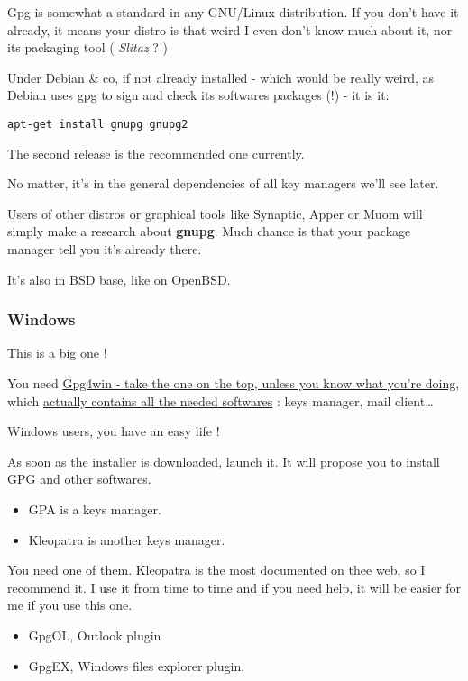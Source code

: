 Gpg is somewhat a standard in any GNU/Linux distribution. If you don't
have it already, it means your distro is that weird I even don't know
much about it, nor its packaging tool ( \emph{Slitaz} ? )

Under Debian \& co, if not already installed - which would be really
weird, as Debian uses gpg to sign and check its softwares packages (!) -
it is it:

\begin{verbatim}
apt-get install gnupg gnupg2
\end{verbatim}

The second release is the recommended one currently.

No matter, it's in the general dependencies of all key managers we'll
see later.

Users of other distros or graphical tools like Synaptic, Apper or Muom
will simply make a research about \textbf{gnupg}. Much chance is that
your package manager tell you it's already there.

It's also in BSD base, like on OpenBSD.

\subsubsection{Windows}\label{windows}

This is a big one !

You need \href{http://www.gpg4win.org/download.html}{Gpg4win - take the
one on the top, unless you know what you're doing}, which
\href{http://www.gpg4win.org/about.html}{actually contains all the
needed softwares} : keys manager, mail client\ldots{}

Windows users, you have an easy life !

As soon as the installer is downloaded, launch it. It will propose you
to install GPG and other softwares.

\begin{itemize}
\itemsep1pt\parskip0pt
\item
  GPA is a keys manager.
\item
  Kleopatra is another keys manager.
\end{itemize}

You need one of them. Kleopatra is the most documented on thee web, so I
recommend it. I use it from time to time and if you need help, it will
be easier for me if you use this one.

\begin{itemize}
\itemsep1pt\parskip0pt
\item
  GpgOL, Outlook plugin
\item
  GpgEX, Windows files explorer plugin.
\end{itemize}

